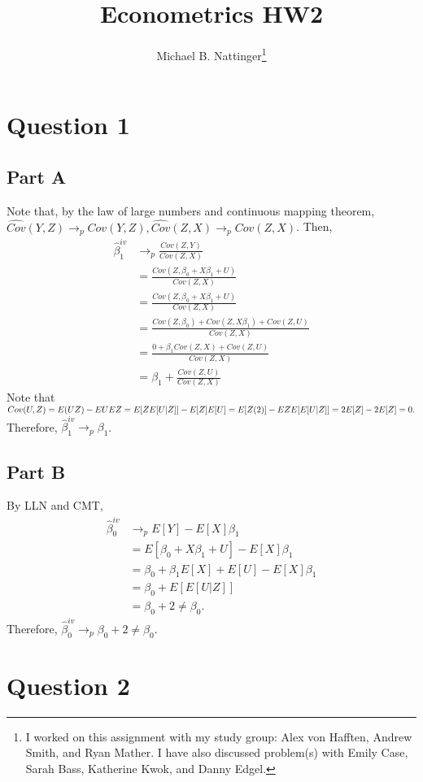 \documentclass[11pt]{article} %
\title{Econometrics HW2}
\author{Michael B. Nattinger\footnote{I worked on this assignment with my study group: Alex von Hafften, Andrew Smith, and Ryan Mather. I have also discussed problem(s) with Emily Case, Sarah Bass, Katherine Kwok, and Danny Edgel.}}
\begin{document}
\maketitle

\section{Question 1}
\subsection{Part A}
Note that, by the law of large numbers and continuous mapping theorem, $\hat{Cov}(Y,Z) \rightarrow_p Cov(Y,Z), \hat{Cov}(Z,X) \rightarrow_p Cov(Z,X)$. 
Then,
\begin{align*}
\hat{\beta}^{iv}_1 &\rightarrow_p \frac{Cov(Z,Y)}{Cov(Z,X)}\\
&=\frac{Cov(Z,\beta_0 + X\beta_1 + U)}{Cov(Z,X)}\\
&=\frac{Cov(Z,\beta_0 + X\beta_1 + U)}{Cov(Z,X)}\\
&= \frac{Cov(Z,\beta_0) + Cov(Z,X\beta_1) + Cov(Z,U)}{Cov(Z,X)}\\
&= \frac{0 + \beta_1Cov(Z,X) + Cov(Z,U)}{Cov(Z,X)}\\
&= \beta_1 +  \frac{ Cov(Z,U)}{Cov(Z,X)}
\end{align*}
Note that $Cov(U,Z) = E(UZ) - EUEZ =\\ E[ZE[U|Z]] - E[Z]E[U] = E[Z(2)] - EZE[E[U|Z]] = 2E[Z] - 2E[Z] = 0.$ Therefore, $\hat{\beta}^{iv}_1 \rightarrow_p \beta_1$.
\subsection{Part B}
By LLN and CMT,
\begin{align*}
\hat{\beta}^{iv}_0 &\rightarrow_p E[Y] - E[X]\beta_1\\
&=  E[\beta_0 + X\beta_1 + U] - E[X]\beta_1\\
&= \beta_0 + \beta_1 E[X] + E[U] - E[X]\beta_1\\
&= \beta_0 + E[E[U|Z]]\\
& = \beta_0 + 2 \neq \beta_0.
\end{align*}
Therefore, $\hat{\beta}^{iv}_0 \rightarrow_p \beta_0 + 2 \neq \beta_0.$
\section{Question 2}
\end{document}
